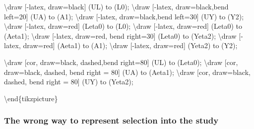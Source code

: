 \documentclass[
  letterpaper,
  DIV=11,
  numbers=noendperiod]{scrartcl}
\newenvironment{Shaded}{\begin{snugshade}}{\end{snugshade}}
\newcommand{\NormalTok}[1]{\textcolor[rgb]{0.00,0.23,0.31}{#1}}
\begin{document}
\begin{Shaded}
\begin{Highlighting}[]
\NormalTok{\textbackslash{}draw [{-}latex, draw=black] (UL) to (L0);}
\NormalTok{\textbackslash{}draw [{-}latex, draw=black,bend left=20] (UA) to (A1);}
\NormalTok{\textbackslash{}draw [{-}latex, draw=black,bend left=30] (UY) to (Y2);}
\NormalTok{\textbackslash{}draw [{-}latex, draw=red] (Leta0) to (L0);}
\NormalTok{\textbackslash{}draw [{-}latex, draw=red] (Leta0) to (Aeta1);}
\NormalTok{\textbackslash{}draw [{-}latex, draw=red, bend right=30] (Leta0) to (Yeta2);}
\NormalTok{\textbackslash{}draw [{-}latex, draw=red] (Aeta1) to (A1);}
\NormalTok{\textbackslash{}draw [{-}latex, draw=red] (Yeta2) to (Y2);}

\NormalTok{\textbackslash{}draw [cor, draw=black, dashed,bend right=80] (UL) to (Leta0);}
\NormalTok{\textbackslash{}draw [cor, draw=black, dashed, bend right = 80] (UA) to (Aeta1);}
\NormalTok{\textbackslash{}draw [cor, draw=black, dashed, bend right = 80] (UY) to (Yeta2);}


\NormalTok{\textbackslash{}end\{tikzpicture\}}
\end{Highlighting}
\end{Shaded}

\hypertarget{the-wrong-way-to-represent-selection-into-the-study}{%
\subsubsection{The wrong way to represent selection into the
study}\label{the-wrong-way-to-represent-selection-into-the-study}}
\end{document}
